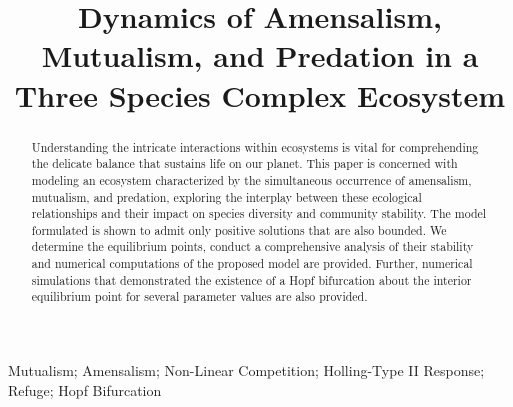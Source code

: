 \documentclass[]{interact}
\theoremstyle{plain}%
\theoremstyle{definition}
\theoremstyle{remark}
\numberwithin{equation}{section}
\begin{document}
\articletype{}%

\title{Dynamics of Amensalism, Mutualism, and Predation in a Three Species Complex Ecosystem}

\author{
}

\maketitle

\begin{abstract}
    Understanding the intricate interactions within ecosystems is vital for comprehending the delicate balance that sustains life on our planet. This paper is concerned with modeling an ecosystem characterized by the simultaneous occurrence of amensalism, mutualism, and predation, exploring the interplay between these ecological relationships and their impact on species diversity and community stability. The model formulated is shown to admit only positive solutions that are also bounded. We determine the equilibrium points, conduct a comprehensive analysis of their stability and numerical computations of the proposed model are provided. Further, numerical simulations that demonstrated the existence of a Hopf bifurcation about the interior equilibrium point for several parameter values are also provided.
\end{abstract}

\begin{keywords}
Mutualism; Amensalism; Non-Linear Competition; Holling-Type II Response; Refuge; Hopf Bifurcation
\end{keywords}















\newpage
\appendix

\end{document}
